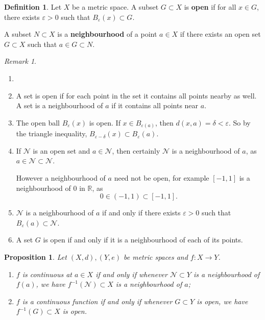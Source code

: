 \documentclass[12pt]{article}
\newtheorem{proposition}{Proposition}[section]
\theoremstyle{definition}
\newtheorem{definition}{Definition}[section]
\theoremstyle{remark}
\newtheorem*{remark}{Remark}
\begin{document}
\begin{definition}
	Let $X$ be a metric space. A subset $G \subset X$ is \textbf{open} if for all $x \in G$, there exists $\varepsilon > 0$ such that $B_{\varepsilon}(x) \subset G$.

	A subset $N \subset X$ is a \textbf{neighbourhood} of a point $a \in X$ if there exists an open set $G \subset X$ such that $a \in G \subset N$.
\end{definition}

\begin{remark}
	\begin{enumerate}[1.]
		\item[]
		\item A set is open if for each point in the set it contains all points nearby as well. A set is a neighbourhood of $a$ if it contains all points near $a$.
		\item The open ball $B_{\varepsilon}(x)$ is open. If $x \in B_{\varepsilon(a)}$, then $d(x, a) = \delta < \varepsilon$. So by the triangle inequality, $B_{\varepsilon - \delta}(x) \subset B_{\varepsilon}(a)$.
		\item If $\mathcal{N}$ is an open set and $a \in \mathcal{N}$, then certainly $\mathcal{N}$ is a neighbourhood of $a$, as $a \in \mathcal{N} \subset \mathcal{N}$.

			However a neighbourhood of $a$ need not be open, for example $[-1, 1]$ is a neighbourhood of $0$ in $\mathbb{R}$, as
			\[
				0 \in (-1, 1) \subset [-1, 1]
			.\]
		\item $\mathcal{N}$ is a neighbourhood of $a$ if and only if there exists $\varepsilon > 0$ such that $B_{\varepsilon}(a) \subset \mathcal{N}$.
		\item A set $G$ is open if and only if it is a neighbourhood of each of its points.
	\end{enumerate}
\end{remark}

\begin{proposition}
	Let $(X, d), (Y, e)$ be metric spaces and $f : X \to Y$.
	\begin{enumerate}[\normalfont(i)]
		\item $f$ is continuous at $a \in X$ if and only if whenever $\mathcal{N} \subset Y$ is a neighbourhood of $f(a)$, we have $f^{-1}(\mathcal{N}) \subset X$ is a neighbourhood of $a$;
		\item $f$ is a continuous function if and only if whenever $G \subset Y$ is open, we have $f^{-1}(G) \subset X$ is open.
	\end{enumerate}
\end{proposition}
\end{document}
